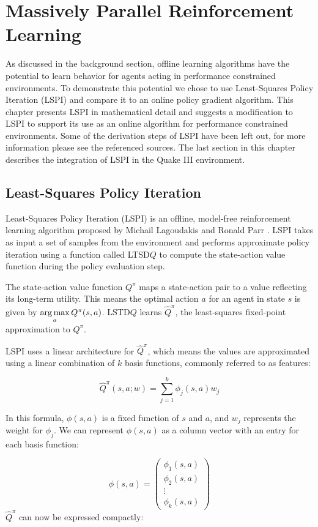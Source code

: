 \chapter{Massively Parallel Reinforcement Learning}
\label{chap:implementation}

As discussed in the background section, offline learning algorithms have the potential to learn behavior for agents acting in performance constrained environments. To demonstrate this potential we chose to use Least-Squares Policy Iteration (LSPI) and compare it to an online policy gradient algorithm. This chapter presents LSPI in mathematical detail and suggests a modification to LSPI to support its use as an online algorithm for performance constrained environments. Some of the derivation steps of LSPI have been left out, for more information please see the referenced sources. The last section in this chapter describes the integration of LSPI in the Quake III environment.

\section{Least-Squares Policy Iteration}
\label{chap:implementation:lspi}

Least-Squares Policy Iteration (LSPI) is an offline, model-free reinforcement learning algorithm proposed by Michail Lagoudakis and Ronald Parr \cite{lspi}. LSPI takes as input a set of samples from the environment and performs approximate policy iteration using a function called LTSD$Q$ to compute the state-action value function during the policy evaluation step.

The state-action value function $Q^\pi$ maps a state-action pair to a value reflecting its long-term utility. This means the optimal action $a$ for an agent in state $s$ is given by $\operatorname*{arg\,max}\limits_a Q^\pi(s,a)$. LSTD$Q$ learns $\hat{Q}^\pi$, the least-squares fixed-point approximation to $Q^\pi$.

LSPI uses a linear architecture for $\hat{Q}^\pi$, which means the values are approximated using a linear combination of $k$ basis functions, commonly referred to as features:

\[
    \hat{Q}^\pi(s,a;w) = \sum_{j=1}^k \phi_j(s,a)w_j
\]

In this formula, $\phi(s,a)$ is a fixed function of $s$ and $a$, and $w_j$ represents the weight for $\phi_j$. We can represent $\phi(s,a)$ as a column vector with an entry for each basis function:

\[
    \phi(s,a) = \begin{pmatrix}
       \phi_1(s,a) \\ \phi_2(s,a) \\ \vdots \\ \phi_k(s,a)
    \end{pmatrix}
\]
$\hat{Q}^\pi$  can now be expressed compactly:

